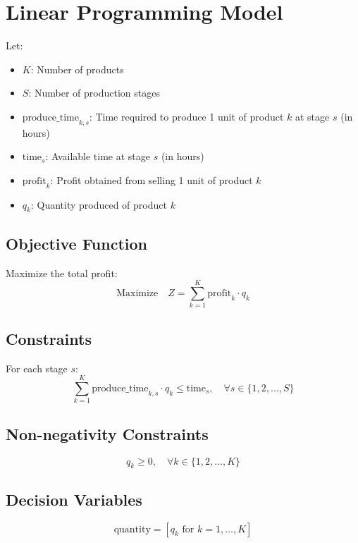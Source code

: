 \documentclass{article}
\begin{document}
\section*{Linear Programming Model}

Let:
\begin{itemize}
    \item \( K \): Number of products
    \item \( S \): Number of production stages
    \item \( \text{produce\_time}_{k,s} \): Time required to produce 1 unit of product \( k \) at stage \( s \) (in hours)
    \item \( \text{time}_{s} \): Available time at stage \( s \) (in hours)
    \item \( \text{profit}_{k} \): Profit obtained from selling 1 unit of product \( k \)
    \item \( q_{k} \): Quantity produced of product \( k \)
\end{itemize}

\subsection*{Objective Function}
Maximize the total profit:
\[
\text{Maximize} \quad Z = \sum_{k=1}^{K} \text{profit}_{k} \cdot q_{k}
\]

\subsection*{Constraints}
For each stage \( s \):
\[
\sum_{k=1}^{K} \text{produce\_time}_{k,s} \cdot q_{k} \leq \text{time}_{s}, \quad \forall s \in \{1, 2, \ldots, S\}
\]

\subsection*{Non-negativity Constraints}
\[
q_{k} \geq 0, \quad \forall k \in \{1, 2, \ldots, K\}
\]

\subsection*{Decision Variables}
\[
\text{quantity} = [q_{k} \text{ for } k = 1, \ldots, K]
\]
\end{document}
